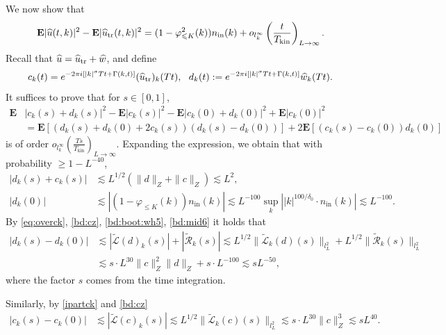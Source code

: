 \documentclass[UTF-8,reqno]{amsart}
\numberwithin{equation}{section}
\theoremstyle{definition}
\def\geq{\geqslant}
\def\leq{\leqslant}
\def\geq{\geqslant}
\def\leq{\leqslant}
\begin{document}
 We now show that   \begin{align*}
    \mathbf E |\widehat u (t, k)|^2-\mathbf E |\widehat u_{\rm tr}(t, k)|^2 =(1-\varphi^2_{\leq K}(k))n_{\mathrm{in}}(k)+o_{l^\infty_k}\left(\frac{t}{T_{\mathrm {kin}}}\right)_{L \to \infty}.
\end{align*}
Recall that $\widehat u=\widehat u_{\rm tr}+\widehat w$, and define
\begin{align*}
    c_k(t)= e^{-2\pi i[|k|^\sigma Tt+\Gamma(k,t)]} (\widehat u_{\rm tr})_k(Tt),\ \ d_k(t):= e^{-2\pi i[|k|^\sigma Tt+\Gamma(k,t)]} \widehat w_k(Tt).
\end{align*}
It suffices to prove that for $s\in[0,1]$,
\begin{align*}
    \mathbf E&|c_k(s)+d_k(s)|^2- \mathbf E|c_k(s)|^2-\mathbf E|c_k(0)+d_k(0)|^2+\mathbf E|c_k(0)|^2\\
    &=\mathbf E[(d_k(s)+d_k(0)+2c_k(s))(d_k(s)-d_k(0))]+2\mathbf E[(c_k(s)-c_k(0))d_k(0)]
\end{align*}
is of order $o_{l^\infty_k}\left(\frac{Ts}{T_{\mathrm {kin}}}\right)_{L \to \infty}$.  Expanding the expression, we obtain  that with probability $\geq 1-L^{-40}$,
\begin{align*}
    |d_k(s)+c_k(s)|&\lesssim L^{1/2}(\|d\|_{Z}+\|c\|_{Z})\lesssim L^2,\\
    |d_k(0)|&\lesssim|(1-\varphi_{\leq K}(k))n_{\mathrm{in}}(k)|\lesssim  L^{-100}\sup_k\left||k|^{100/\delta_0}\cdot n_{\mathrm{in}}(k)\right|\lesssim L^{-100}.
\end{align*}
By \eqref{eq:overck},  \eqref{bd:cz}, 
\eqref{bd:boot:wh5},  \eqref{bd:mid6} it holds that
\begin{align*}
   | d_k(s)-d_k(0)|&\lesssim |\widetilde{\mathscr{L}}( d)_k(s)|+|\tilde{\mathscr{R}}_k(s)|\lesssim  L^{1/2}\| \widetilde{\mathscr{L}}_k(d)(s)\|_{l_L^2}+ L^{1/2}\| \tilde{\mathscr{R}}_k(s)\|_{l_L^2}\\
   &\lesssim s\cdot L^{30}\|c\|_{Z}^2\|d\|_{Z}+s\cdot L^{-100}\lesssim
    sL^{-50},
\end{align*}
where the factor $s$ comes from the time integration. 

Similarly, by \eqref{ipartck} and  \eqref{bd:cz}  
\begin{align*}
     | c_k(s)-c_k(0)|&\lesssim |\widetilde{\mathscr{L}}( c)_k(s)|\lesssim  L^{1/2}\| \widetilde{\mathscr{L}}_k(c)(s)\|_{l_L^2} \lesssim s\cdot L^{30}\|c\|_{Z}^3 \lesssim
    sL^{40}.
\end{align*}
\end{document}

